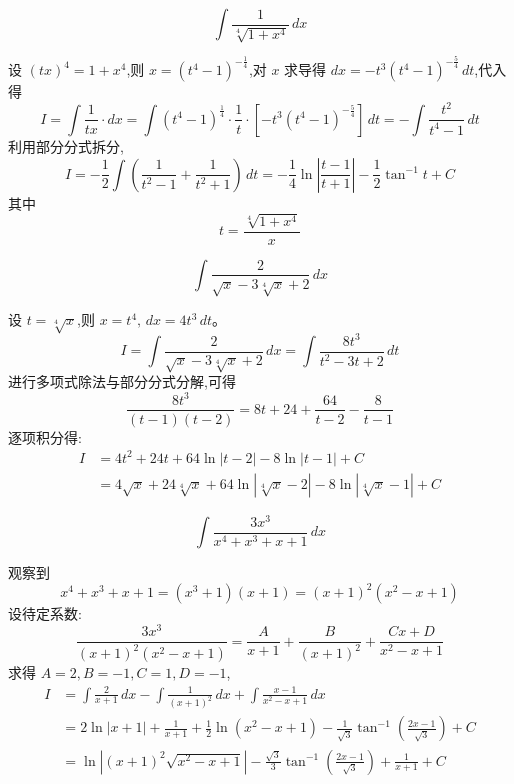 \begin{questions}
    \question 
    \[
    \int \frac{1}{\sqrt[4]{1+x^4}} \, dx
    \]
    \begin{solution}
        设 $(tx)^4 = 1+x^4$,则 $x = (t^4-1)^{-\frac{1}{4}}$,对 $x$ 求导得 $dx = -t^3(t^4-1)^{-\frac{5}{4}} \, dt$,代入得
        \[
        I = \int \frac{1}{tx} \cdot dx = \int (t^4-1)^{\frac{1}{4}} \cdot \frac{1}{t} \cdot [-t^3(t^4-1)^{-\frac{5}{4}}] \, dt = -\int \frac{t^2}{t^4-1} \, dt
        \]
        利用部分分式拆分,
        \[
        I = -\frac{1}{2} \int \left( \frac{1}{t^2-1} + \frac{1}{t^2+1} \right) \, dt = -\frac{1}{4} \ln\left| \frac{t-1}{t+1} \right| - \frac{1}{2} \tan^{-1} t + C
        \]
        其中 
        \[
        t = \frac{\sqrt[4]{1+x^4}}{x}
        \]
    \end{solution}

    \question
    \[
    \int \frac{2}{\sqrt{x} - 3\sqrt[4]{x} + 2} \, dx
    \]
    \begin{solution}
        设 $t = \sqrt[4]{x}$,则 $x = t^4, \, dx = 4t^3 \, dt$。
        \[
        I = \int \frac{2}{\sqrt{x} - 3\sqrt[4]{x} + 2} \, dx = \int \frac{8t^3}{t^2 - 3t + 2} \, dt
        \]
        进行多项式除法与部分分式分解,可得
        \[
        \frac{8t^3}{(t-1)(t-2)} = 8t + 24 + \frac{64}{t-2} - \frac{8}{t-1}
        \]
        逐项积分得:
        \begin{align*}
        I &= 4t^2 + 24t + 64 \ln|t-2| - 8 \ln|t-1| + C \\
        &= 4\sqrt{x} + 24\sqrt[4]{x} + 64 \ln|\sqrt[4]{x}-2| - 8 \ln|\sqrt[4]{x}-1| + C
        \end{align*}
    \end{solution}

    \question
    \[
    \int \frac{3x^3}{x^4 + x^3 + x + 1} \, dx
    \]
    \begin{solution}
        观察到
        \[
        x^4+x^3+x+1 = (x^3+1)(x+1) = (x+1)^2(x^2-x+1)
        \]
        设待定系数:
        \[
        \frac{3x^3}{(x+1)^2(x^2-x+1)} = \frac{A}{x+1} + \frac{B}{(x+1)^2} + \frac{Cx+D}{x^2-x+1}
        \]
        求得 $A=2, B=-1, C=1, D=-1$,
        \begin{align*}
        I &= \int \frac{2}{x+1} \, dx - \int \frac{1}{(x+1)^2} \, dx + \int \frac{x-1}{x^2-x+1} \, dx \\
        &= 2\ln|x+1| + \frac{1}{x+1} + \frac{1}{2}\ln(x^2-x+1) - \frac{1}{\sqrt{3}}\tan^{-1}\left(\frac{2x-1}{\sqrt{3}}\right) + C \\
        &= \ln\left|(x+1)^2 \sqrt{x^2-x+1}\right| - \frac{\sqrt{3}}{3} \tan^{-1}\left(\frac{2x-1}{\sqrt{3}}\right) + \frac{1}{x+1} + C
        \end{align*}
    \end{solution}


\end{questions}
